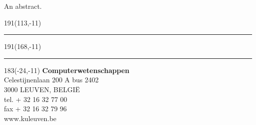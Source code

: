 \documentclass[12pt,a4paper,oneside]{book}
\begin{document}
An abstract.
\tableofcontents
\newpage
\listoffigures
{}
\newpage
\printglossary[type=\acronymtype ,title=Afkortingen ,style=mystyle]
\newpage
{}
\printglossary[title=Symbolen,style=mystyle]

\mainmatter
{}











\newpage
\thispagestyle{empty}
\sffamily
%
\begin{textblock}{191}(113,-11)
{\color{blueline}\rule{160pt}{5.5pt}}
\end{textblock}
%
\begin{textblock}{191}(168,-11)
{\color{blueline}\rule{5.5pt}{59pt}}
\end{textblock}
%
\begin{textblock}{183}(-24,-11)
\textblockcolour{}
\flushright
\fontsize{7}{7.5}\selectfont
\textbf{Computerwetenschappen}\\
Celestijnenlaan 200 A bus 2402\\
3000 LEUVEN, BELGI\"{E}\\
tel. + 32 16 32 77 00\\
fax + 32 16 32 79 96\\
www.kuleuven.be\\
\end{textblock}
%
\end{document}
